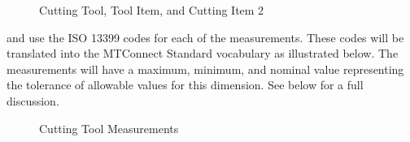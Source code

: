 \begin{figure}[ht]
  \centering
  \caption{Cutting Tool, Tool Item, and Cutting Item 2}
  \label{fig:cutting-tool-tool-item-cutting-item-2}
\end{figure}

\FloatBarrier

 and  use the ISO 13399 codes for each of the measurements.  These codes will be translated into the MTConnect Standard vocabulary as illustrated below.  The measurements will have a maximum, minimum, and nominal value representing the tolerance of allowable values for this dimension.  See below for a full discussion.

\begin{figure}[ht]
  \centering
  \caption{Cutting Tool Measurements}
  \label{fig:cutting-tool-measurements}
\end{figure}

